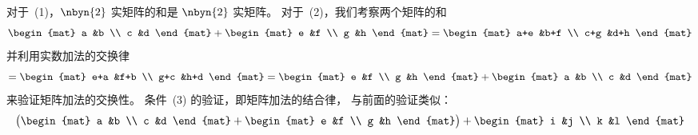 \begin{exercises}
\begin{answer}
\begin{exparts}
          对于~(1)，$\nbyn{2}$ 实矩阵的和是 $\nbyn{2}$
          实矩阵。
          对于~(2)，我们考察两个矩阵的和
          \begin{equation*}
            \begin{mat}
              a  &b  \\
              c  &d
            \end{mat}+
            \begin{mat}
              e  &f  \\
              g  &h
            \end{mat}
            =
            \begin{mat}
              a+e  &b+f  \\
              c+g  &d+h
            \end{mat}
          \end{equation*}
          并利用实数加法的交换律
          \begin{equation*}
            =\begin{mat}
              e+a  &f+b  \\
              g+c  &h+d
            \end{mat}
            =
            \begin{mat}
              e  &f  \\
              g  &h
            \end{mat}
            +
            \begin{mat}
              a  &b  \\
              c  &d
            \end{mat}
          \end{equation*}
          来验证矩阵加法的交换性。
          条件~(3) 的验证，即矩阵加法的结合律，
          与前面的验证类似：
          \begin{equation*}
            \big(
              \begin{mat}
                a  &b  \\
                c  &d
              \end{mat}
              +\begin{mat}
                e  &f  \\
                g  &h
              \end{mat}
            \big)
            +
            \begin{mat}
              i  &j  \\
              k  &l
            \end{mat}

\end{equation*}
\end{exparts}
\end{answer}
\end{exercises}
